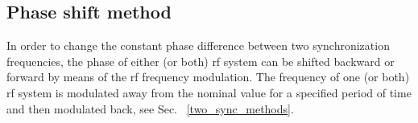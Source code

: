 %
%
%
%

\subsection{Phase shift method}
\label{sec:requirement_phase_shift}

In order to change the constant phase difference between two synchronization frequencies, the phase of either (or both) rf system can be shifted backward or forward by means of the rf frequency modulation. The frequency of one (or both) rf system is modulated away from the nominal value for a specified period of time and then modulated back, see Sec. ~\ref{two_sync_methods}.


